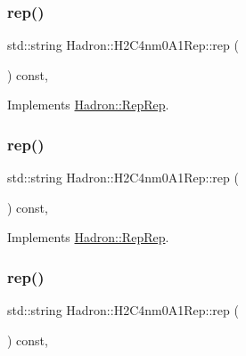\subsubsection{\texorpdfstring{rep()}{rep()}\hspace{0.1cm}{\footnotesize\ttfamily [1/3]}}
{\footnotesize\ttfamily std\+::string Hadron\+::\+H2\+C4nm0\+A1\+Rep\+::rep (\begin{DoxyParamCaption}{ }\end{DoxyParamCaption}) const\hspace{0.3cm}{\ttfamily [inline]}, {\ttfamily [virtual]}}



Implements \mbox{\hyperlink{structHadron_1_1RepRep_ab3213025f6de249f7095892109575fde}{Hadron\+::\+Rep\+Rep}}.

\mbox{\label{structHadron_1_1H2C4nm0A1Rep_af78536d0069f367b69654854815b015d}} 
\subsubsection{\texorpdfstring{rep()}{rep()}\hspace{0.1cm}{\footnotesize\ttfamily [2/3]}}
{\footnotesize\ttfamily std\+::string Hadron\+::\+H2\+C4nm0\+A1\+Rep\+::rep (\begin{DoxyParamCaption}{ }\end{DoxyParamCaption}) const\hspace{0.3cm}{\ttfamily [inline]}, {\ttfamily [virtual]}}



Implements \mbox{\hyperlink{structHadron_1_1RepRep_ab3213025f6de249f7095892109575fde}{Hadron\+::\+Rep\+Rep}}.

\mbox{\label{structHadron_1_1H2C4nm0A1Rep_af78536d0069f367b69654854815b015d}} 
\subsubsection{\texorpdfstring{rep()}{rep()}\hspace{0.1cm}{\footnotesize\ttfamily [3/3]}}
{\footnotesize\ttfamily std\+::string Hadron\+::\+H2\+C4nm0\+A1\+Rep\+::rep (\begin{DoxyParamCaption}{ }\end{DoxyParamCaption}) const\hspace{0.3cm}{\ttfamily [inline]}, {\ttfamily [virtual]}}



